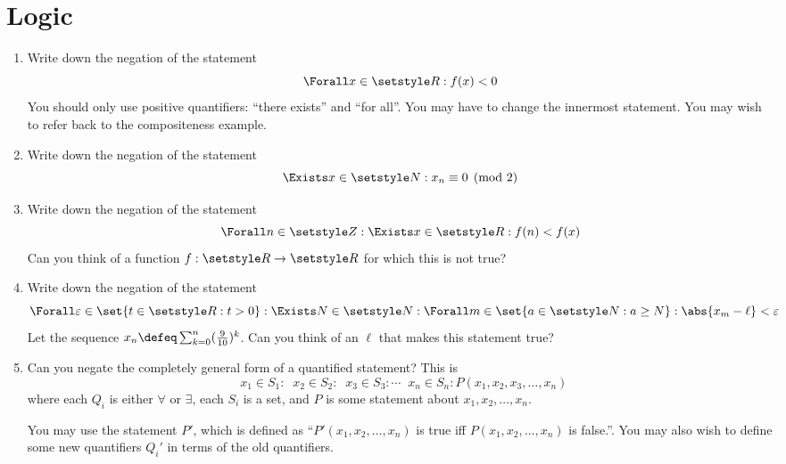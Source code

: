 \section*{Logic}

\begin{enumerate}
 \item
  Write down the negation of the statement
  \begin{equation*}
   \Forall x \in \Reals: f(x) < 0
  \end{equation*}
  You should only use positive quantifiers: ``there exists'' and ``for all''.
  You may have to change the innermost statement. You may wish to refer back to
  the compositeness example.
 \item
  Write down the negation of the statement
  \begin{equation*}
   \Exists x \in \Naturals : x_n \equiv 0 \pmod 2
  \end{equation*}
 \item
  Write down the negation of the statement
  \begin{equation*}
   \Forall n \in \Integers :
   \Exists x \in \Reals :
   f(n) < f(x)
  \end{equation*}
  Can you think of a function \(f : \Reals \to \Reals\) for which this is not
  true?
 \item
  Write down the negation of the statement
  \begin{equation*}
   \Forall \epsilon \in \set{t \in \Reals: t > 0} :
   \Exists N \in \Naturals :
   \Forall m \in \set{a \in \Naturals : a \ge N}:
   \abs{x_m - \ell} < \epsilon
  \end{equation*}
  Let the sequence \(x_n \defeq \sum_{k = 0}^n(\frac 9{10})^k\). Can you think
  of an \(\ell\) that makes this statement true?
 \item
  Can you negate the completely general form of a quantified statement? This is
  \begin{equation*}
   \mathop{Q_1} x_1 \in S_1 :
   \mathop{Q_2} x_2 \in S_2 :
   \mathop{Q_3} x_3 \in S_3 :
   \dotsb
   \mathop{Q_n} x_n \in S_n :
   P(x_1, x_2, x_3, \dotsc, x_n)
  \end{equation*}
  where each \(Q_i\) is either \(\forall\) or \(\exists\), each \(S_i\) is a
  set, and \(P\) is some statement about \(x_1, x_2, \dotsc, x_n\).

  You may use the statement \(P'\), which is defined as
  ``\(P'(x_1, x_2, \dotsc, x_n)\) is true iff \(P(x_1, x_2, \dotsc, x_n)\) is
  false.''. You may also wish to define some new quantifiers \(Q_i'\) in terms
  of the old quantifiers.
\end{enumerate}

